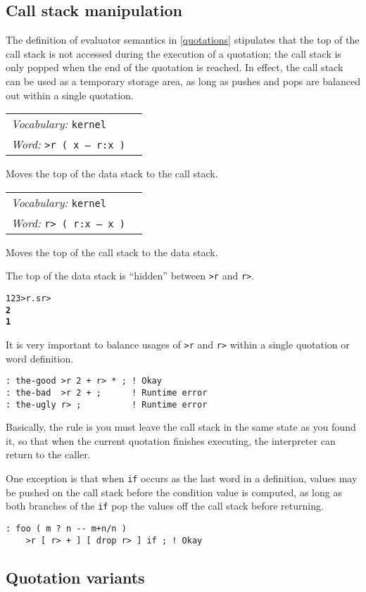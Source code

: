 \documentclass{book}
\newcommand{\vocabulary}[1]{\emph{Vocabulary:} \texttt{#1}&\\}
\newcommand{\ordinaryword}[2]{\index{\texttt{#1}}\emph{Word:} \texttt{#2}&\\}
\newcommand{\wordtable}[1]{


\begin{tabularx}{12cm}{lX}
\hline
#1
\hline
\end{tabularx}

}
\begin{document}
\subsection{Call stack manipulation}

The definition of evaluator semantics in \ref{quotations} stipulates that the top of the call stack is not accessed during the execution of a quotation; the call stack is only popped when the end of the quotation is reached. In effect, the call stack can be used as a temporary storage area, as long as pushes and pops are balanced out within a single quotation.
\wordtable{
\vocabulary{kernel}
\ordinaryword{>r}{>r ( x -- r:x )}
}
Moves the top of the data stack to the call stack.
\wordtable{
\vocabulary{kernel}
\ordinaryword{r>}{r> ( r:x -- x )}
}
Moves the top of the call stack to the data stack.

The top of the data stack is ``hidden'' between \texttt{>r} and \texttt{r>}.
\begin{alltt}
  1 2 3 >r .s r>
\textbf{2
1}
\end{alltt}
It is very important to balance usages of \texttt{>r} and \texttt{r>} within a single quotation or word definition.
\begin{verbatim}
: the-good >r 2 + r> * ; ! Okay
: the-bad  >r 2 + ;      ! Runtime error
: the-ugly r> ;          ! Runtime error
\end{verbatim}
Basically, the rule is you must leave the call stack in the same state as you found it, so that when the current quotation finishes executing, the interpreter can return to the caller.

One exception is that when \texttt{if} occurs as the last word in a definition, values may be pushed on the call stack before the condition value is computed, as long as both branches of the \texttt{if} pop the values off the call stack before returning.
\begin{verbatim}
: foo ( m ? n -- m+n/n )
    >r [ r> + ] [ drop r> ] if ; ! Okay
\end{verbatim}

\subsection{Quotation variants}
\end{document}
